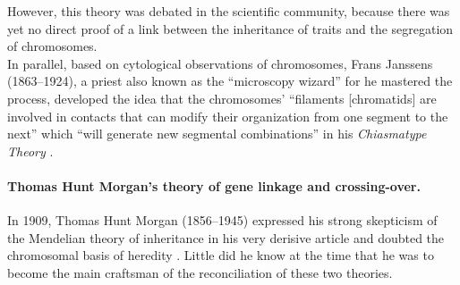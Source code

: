 However, this theory was debated in the scientific community, because there was yet no direct proof of a link between the inheritance of traits and the segregation of chromosomes.\\ 

In parallel, based on cytological observations of chromosomes, Frans Janssens (1863--1924), a priest also known as the “microscopy wizard” for he mastered the process, developed the idea that the chromosomes' “filaments [chromatids] are involved in contacts that can modify their organization from one segment to the next” which “will generate new segmental combinations” in his \textit{Chiasmatype Theory} \citep{janssens1909theorie}.



\paragraph{Thomas Hunt Morgan's theory of gene linkage and crossing-over.}
% 
In 1909, Thomas Hunt Morgan (1856--1945) expressed his strong skepticism of the Mendelian theory of inheritance in his very derisive article \textit{} \citep{morgan1909factors} and doubted the chromosomal basis of heredity \citep[reviewed in][]{koszul2012centenary}.
Little did he know at the time that he was to become the main craftsman of the reconciliation of these two theories.\\




